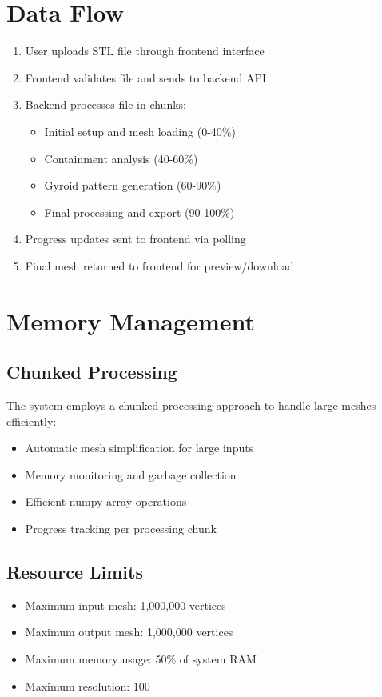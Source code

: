 \section{Data Flow}
\begin{enumerate}
    \item User uploads STL file through frontend interface
    \item Frontend validates file and sends to backend API
    \item Backend processes file in chunks:
    \begin{itemize}
        \item Initial setup and mesh loading (0-40\%)
        \item Containment analysis (40-60\%)
        \item Gyroid pattern generation (60-90\%)
        \item Final processing and export (90-100\%)
    \end{itemize}
    \item Progress updates sent to frontend via polling
    \item Final mesh returned to frontend for preview/download
\end{enumerate}

\section{Memory Management}
\subsection{Chunked Processing}
The system employs a chunked processing approach to handle large meshes efficiently:
\begin{itemize}
    \item Automatic mesh simplification for large inputs
    \item Memory monitoring and garbage collection
    \item Efficient numpy array operations
    \item Progress tracking per processing chunk
\end{itemize}

\subsection{Resource Limits}
\begin{itemize}
    \item Maximum input mesh: 1,000,000 vertices
    \item Maximum output mesh: 1,000,000 vertices
    \item Maximum memory usage: 50\% of system RAM
    \item Maximum resolution: 100
\end{itemize}
